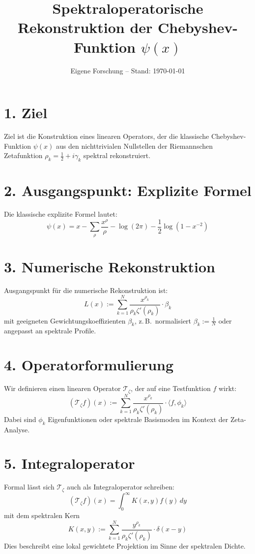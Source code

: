 \documentclass[12pt]{article}
\title{Spektraloperatorische Rekonstruktion der Chebyshev-Funktion \texorpdfstring{$\psi(x)$}{ψ(x)}}
\author{Eigene Forschung – Stand: \today}
\date{}
\begin{document}
\maketitle

\section*{1. Ziel}
Ziel ist die Konstruktion eines linearen Operators, der die klassische Chebyshev-Funktion $\psi(x)$ aus den nichttrivialen Nullstellen der Riemannschen Zetafunktion $\rho_k = \frac{1}{2} + i\gamma_k$ spektral rekonstruiert.

\section*{2. Ausgangspunkt: Explizite Formel}
Die klassische explizite Formel lautet:
\[
\psi(x) = x - \sum_{\rho} \frac{x^\rho}{\rho} - \log(2\pi) - \frac{1}{2} \log(1 - x^{-2})
\]

\section*{3. Numerische Rekonstruktion}
Ausgangspunkt für die numerische Rekonstruktion ist:
\[
L(x) := \sum_{k=1}^N \frac{x^{\rho_k}}{\rho_k \zeta'(\rho_k)} \cdot \beta_k
\]
mit geeigneten Gewichtungskoeffizienten $\beta_k$, z.\,B.\ normalisiert $\beta_k := \frac{1}{N}$ oder angepasst an spektrale Profile.

\section*{4. Operatorformulierung}
Wir definieren einen linearen Operator $\mathcal{T}_\zeta$, der auf eine Testfunktion $f$ wirkt:
\[
(\mathcal{T}_\zeta f)(x) := \sum_{k=1}^{N} \frac{x^{\rho_k}}{\rho_k \zeta'(\rho_k)} \cdot \langle f, \phi_k \rangle
\]
Dabei sind $\phi_k$ Eigenfunktionen oder spektrale Basismoden im Kontext der Zeta-Analyse.

\section*{5. Integraloperator}
Formal lässt sich $\mathcal{T}_\zeta$ auch als Integraloperator schreiben:
\[
(\mathcal{T}_\zeta f)(x) = \int_0^\infty K(x,y) f(y) \, dy
\]
mit dem spektralen Kern
\[
K(x,y) := \sum_{k=1}^N \frac{y^{\rho_k}}{\rho_k \zeta'(\rho_k)} \cdot \delta(x - y)
\]
Dies beschreibt eine lokal gewichtete Projektion im Sinne der spektralen Dichte.
\end{document}
